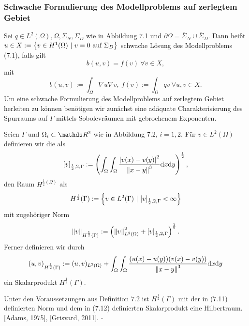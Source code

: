 \subsubsection{Schwache Formulierung des Modellproblems auf zerlegtem Gebiet}

Sei $q\in L^2(\Omega),\Omega,\Sigma_N,\Sigma_D$ wie in Abbildung 7.1 und $\partial \Omega=\bar{\Sigma}_N\cup \bar{\Sigma}_D$.
Dann heißt $u\in X:=\left\{v\in H^1(\Omega)~|~v=0 \text{ auf }\Sigma_D\right\}$ schwache Lösung des Modellproblems (7.1), falls gilt
\[
b(u,v)=f(v)~\forall v\in X,
\]
mit 
\[
b(u,v) := \int_{\Omega} \nabla u\nabla v,~ f(v):= \int_{\Omega} qv ~\forall u,v\in X.
\]
Um eine schwache Formulierung des Modellproblems auf zerlegtem Gebiet herleiten zu können benötigen wir zunächst eine adäquate Charakterisierung des Spurraums auf $\Gamma$ mittels Sobolevräumen mit gebrochenem Exponenten.

Seien $\Gamma$ und $\Omega_i\subset \R^2$ wie in Abbildung 7.2, $i=1,2$.
Für $v\in L^2(\Omega)$ definieren wir die  als 
\[
[v]_{\frac{1}{2},2,\Gamma} := \left( \int_\Omega \int_\Omega \frac{\left\vert v(x)-v(y)\right\vert^2}{\left\Vert x-y\right\Vert^3}\mathrm{d} x\mathrm{d} y\right)^{\frac{1}{2}},
\]
den Raum $H^{\frac{1}{2}(\Omega)}$ als
\begin{align}
H^{\frac{1}{2}}(\Gamma) := \left\{v\in L^2(\Gamma)~|~ [v]_{\frac{1}{2},2,\Gamma} < \infty\right\}
\end{align}
mit zugehöriger Norm
\begin{align}
\left\Vert v\right\Vert_{H^{\frac{1}{2}}(\Gamma)} := \left( \left\Vert v\right\Vert_{L^2(\Omega)}^2 + [v]_{\frac{1}{2},2,\Gamma}\right)^{\frac{1}{2}}.
\end{align}
Ferner definieren wir durch
\begin{align}
(u,v)_{H^{\frac{1}{2}}(\Gamma)} := (u,v)_{L^2(\Omega)} + \int_\Omega \int_\Omega \frac{(u(x)-u(y))(v(x)-v(y))}{\left\Vert x-y\right\Vert^3}\mathrm{d} x\mathrm{d} y
\end{align}
ein Skalarprodukt $H^{\frac{1}{2}}(\Gamma)$.

Unter den Voraussetzungen aus Definition 7.2 ist $H^{\frac{1}{2}}(\Gamma)$ mit der in (7.11) definierten Norm und dem in (7.12) definierten Skalarprodukt eine Hilbertraum.\\

 [Adams, 1975], [Grisvard, 2011].
\hfill $\square$

